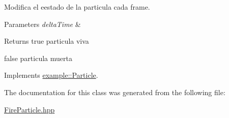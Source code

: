Modifica el eestado de la particula cada frame. 


\begin{DoxyParams}{Parameters}
{\em delta\+Time} & \\
\hline
\end{DoxyParams}
\begin{DoxyReturn}{Returns}
true particula viva 

false particula muerta 
\end{DoxyReturn}


Implements \mbox{\hyperlink{classexample_1_1_particle}{example\+::\+Particle}}.



The documentation for this class was generated from the following file\+:\begin{DoxyCompactItemize}
\item 
\mbox{\hyperlink{_fire_particle_8hpp}{Fire\+Particle.\+hpp}}\end{DoxyCompactItemize}
